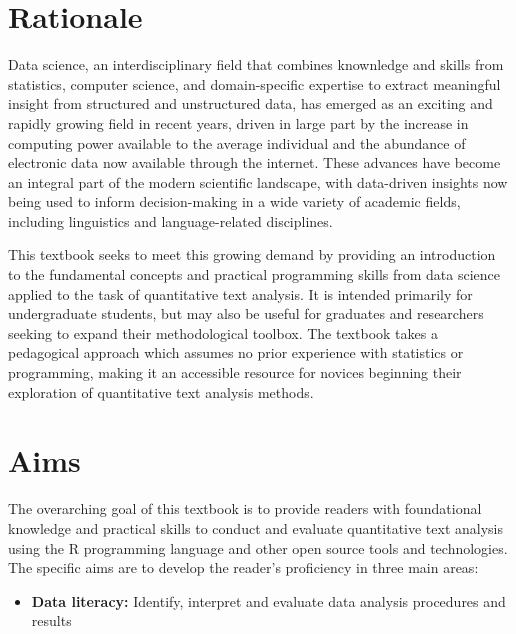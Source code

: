 \documentclass[
  letterpaper,
  DIV=11,
  numbers=noendperiod]{scrreport}
\providecommand{\tightlist}{%
  \setlength{\itemsep}{0pt}\setlength{\parskip}{0pt}}\usepackage{longtable,booktabs,array}
\theoremstyle{definition}
\theoremstyle{remark}
\begin{document}
\hypertarget{sec-p-rationale}{%
\section*{Rationale}\label{sec-p-rationale}}


Data science, an interdisciplinary field that combines knownledge and
skills from statistics, computer science, and domain-specific expertise
to extract meaningful insight from structured and unstructured data, has
emerged as an exciting and rapidly growing field in recent years, driven
in large part by the increase in computing power available to the
average individual and the abundance of electronic data now available
through the internet. These advances have become an integral part of the
modern scientific landscape, with data-driven insights now being used to
inform decision-making in a wide variety of academic fields, including
linguistics and language-related disciplines.

This textbook seeks to meet this growing demand by providing an
introduction to the fundamental concepts and practical programming
skills from data science applied to the task of quantitative text
analysis. It is intended primarily for undergraduate students, but may
also be useful for graduates and researchers seeking to expand their
methodological toolbox. The textbook takes a pedagogical approach which
assumes no prior experience with statistics or programming, making it an
accessible resource for novices beginning their exploration of
quantitative text analysis methods.

\hypertarget{sec-p-aims}{%
\section*{Aims}\label{sec-p-aims}}


The overarching goal of this textbook is to provide readers with
foundational knowledge and practical skills to conduct and evaluate
quantitative text analysis using the R programming language and other
open source tools and technologies. The specific aims are to develop the
reader's proficiency in three main areas:

\begin{itemize}
\tightlist
\item
  \textbf{Data literacy:} Identify, interpret and evaluate data analysis
  procedures and results
\end{itemize}
\end{document}
